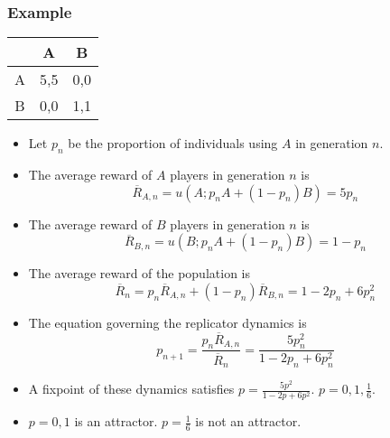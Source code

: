 \documentclass[UTF8,11pt,colorlinks,compress,openany]{beamer}%
\begin{document}
\begin{frame}\frametitle{Example}
\setlength\abovedisplayskip{0pt}
\setlength\belowdisplayskip{0pt}
\begin{table}
\begin{tabu}{c|c|c}
\hline
 & A & B\\
\hline
A & 5,5 & 0,0\\
B & 0,0 & 1,1\\
\hline
\end{tabu}
\end{table}
\begin{itemize}
	\item Let $p_n$ be the proportion of individuals using $A$ in generation $n$.
	\item The average reward of $A$ players in generation $n$ is
	\[\overline{R}_{A,n}=u(A;p_nA+(1-p_n)B)=5p_n\]
	\item The average reward of $B$ players in generation $n$ is
	\[\overline{R}_{B,n}=u(B;p_nA+(1-p_n)B)=1-p_n\]
	\item The average reward of the population is
	\[\overline{R}_n=p_n\overline{R}_{A,n}+(1-p_n)\overline{R}_{B,n}=1-2p_n+6p_n^2\]
	\item The equation governing the replicator dynamics is
	\[p_{n+1}=\frac{p_n\overline{R}_{A,n}}{\overline{R}_n}=\frac{5p_n^2}{1-2p_n+6p_n^2}\]
	\item A fixpoint of these dynamics satisfies $p=\frac{5p^2}{1-2p+6p^2}$. $p=0,1,\frac{1}{6}$.
	\item $p=0,1$ is an attractor. $p=\frac{1}{6}$ is not an attractor.
\end{itemize}
\end{frame}
\end{document}
